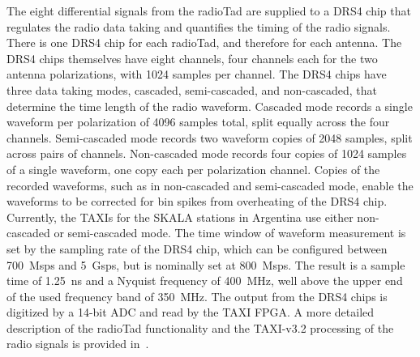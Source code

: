 The eight differential signals from the radioTad are supplied to a DRS4 chip that regulates the radio data taking and quantifies the timing of the radio signals.
There is one DRS4 chip for each radioTad, and therefore for each antenna.
The DRS4 chips themselves have eight channels, four channels each for the two antenna polarizations, with 1024 samples per channel.
The DRS4 chips have three data taking modes, cascaded, semi-cascaded, and non-cascaded, that determine the time length of the radio waveform.
Cascaded mode records a single waveform per polarization of 4096 samples total, split equally across the four channels.
Semi-cascaded mode records two waveform copies of 2048 samples, split across pairs of channels.
Non-cascaded mode records four copies of 1024 samples of a single waveform, one copy each per polarization channel.
Copies of the recorded waveforms, such as in non-cascaded and semi-cascaded mode, enable the waveforms to be corrected for bin spikes from overheating of the DRS4 chip.
Currently, the TAXIs for the SKALA stations in Argentina use either non-cascaded or semi-cascaded mode.
The time window of waveform measurement is set by the sampling rate of the DRS4 chip, which can be configured between \qty{700}{Msps} and \qty{5}{Gsps}, but is nominally set at \qty{800}{Msps}.
The result is a sample time of \qty{1.25}{\nano\second} and a Nyquist frequency of \qty{400}{\mega\hertz}, well above the upper end of the used frequency band of \qty{350}{\mega\hertz}.
The output from the DRS4 chips is digitized by a 14-bit ADC and read by the TAXI FPGA.
A more detailed description of the radioTad functionality and the TAXI-v3.2 processing of the radio signals is provided in~\cite{roxanneturcotte_phd2023}.





